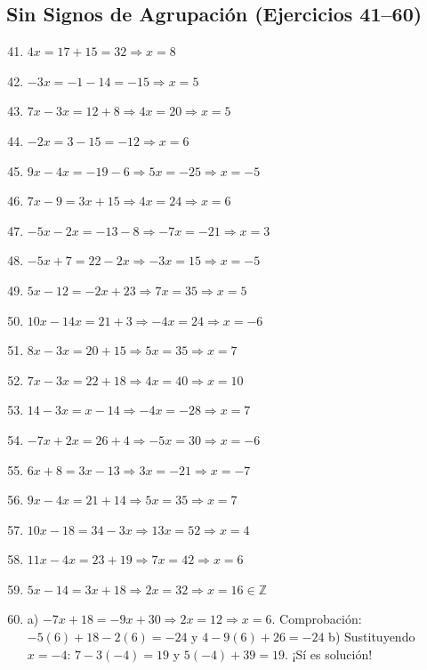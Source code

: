 \documentclass[12pt, letterpaper]{article}
\newcommand{\Z}{\mathbb{Z}}
\begin{document}
  \subsection*{Sin Signos de Agrupación (Ejercicios 41--60)}

  \begin{enumerate}[leftmargin=*, label=\textbf{\arabic*.}]
    \setcounter{enumi}{40}
    \item $4x = 17 + 15 = 32 \Rightarrow x = 8$
    \item $-3x = -1 - 14 = -15 \Rightarrow x = 5$
    \item $7x - 3x = 12 + 8 \Rightarrow 4x = 20 \Rightarrow x = 5$
    \item $-2x = 3 - 15 = -12 \Rightarrow x = 6$
    \item $9x - 4x = -19 - 6 \Rightarrow 5x = -25 \Rightarrow x = -5$
    \item $7x - 9 = 3x + 15 \Rightarrow 4x = 24 \Rightarrow x = 6$
    \item $-5x - 2x = -13 - 8 \Rightarrow -7x = -21 \Rightarrow x = 3$
    \item $-5x + 7 = 22 - 2x \Rightarrow -3x = 15 \Rightarrow x = -5$
    \item $5x - 12 = -2x + 23 \Rightarrow 7x = 35 \Rightarrow x = 5$
    \item $10x - 14x = 21 + 3 \Rightarrow -4x = 24 \Rightarrow x = -6$
    \item $8x - 3x = 20 + 15 \Rightarrow 5x = 35 \Rightarrow x = 7$
    \item $7x - 3x = 22 + 18 \Rightarrow 4x = 40 \Rightarrow x = 10$
    \item $14 - 3x = x - 14 \Rightarrow -4x = -28 \Rightarrow x = 7$
    \item $-7x + 2x = 26 + 4 \Rightarrow -5x = 30 \Rightarrow x = -6$
    \item $6x + 8 = 3x - 13 \Rightarrow 3x = -21 \Rightarrow x = -7$
    \item $9x - 4x = 21 + 14 \Rightarrow 5x = 35 \Rightarrow x = 7$
    \item $10x - 18 = 34 - 3x \Rightarrow 13x = 52 \Rightarrow x = 4$
    \item $11x - 4x = 23 + 19 \Rightarrow 7x = 42 \Rightarrow x = 6$
    \item $5x - 14 = 3x + 18 \Rightarrow 2x = 32 \Rightarrow x = 16 \in \Z$ \checkmark
    \item a) $-7x + 18 = -9x + 30 \Rightarrow 2x = 12 \Rightarrow x = 6$. Comprobación: $-5(6)+18-2(6) = -24$ y $4-9(6)+26 = -24$ \checkmark \quad b) Sustituyendo $x = -4$: $7 - 3(-4) = 19$ y $5(-4) + 39 = 19$. ¡Sí es solución!
  \end{enumerate}
\end{document}
